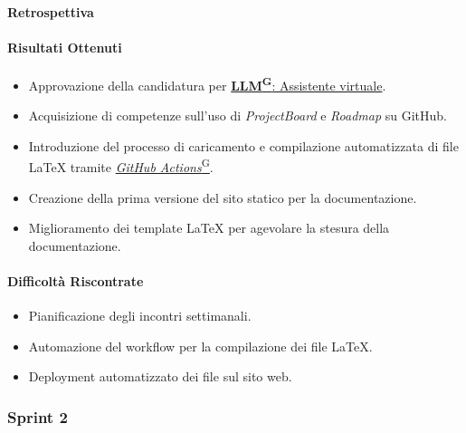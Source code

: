 \documentclass{article}
\begin{document}
                \paragraph{Retrospettiva}
                \paragraph{Risultati Ottenuti}
                    \begin{itemize}
                        \item Approvazione della candidatura per \href{https://code7crusaders.github.io/docs/RTB/documentazione_interna/glossario.html#llm-large-language-model}{\textbf{LLM\textsuperscript{G}}: Assistente virtuale}.
                        \item Acquisizione di competenze sull'uso di \emph{ProjectBoard} e \emph{Roadmap} su GitHub.
                        \item Introduzione del processo di caricamento e compilazione automatizzata di file LaTeX tramite \href{https://code7crusaders.github.io/docs/RTB/documentazione_interna/glossario.html#github-actions}{\emph{GitHub Actions}\textsuperscript{G}}.
                        \item Creazione della prima versione del sito statico per la documentazione.
                        \item Miglioramento dei template LaTeX per agevolare la stesura della documentazione.
                    \end{itemize}

                    \paragraph{Difficoltà Riscontrate}
                    \begin{itemize}
                        \item Pianificazione degli incontri settimanali.
                        \item Automazione del workflow per la compilazione dei file LaTeX.
                        \item Deployment automatizzato dei file sul sito web.
                    \end{itemize}
            \subsubsection{Sprint 2}
\end{document}
